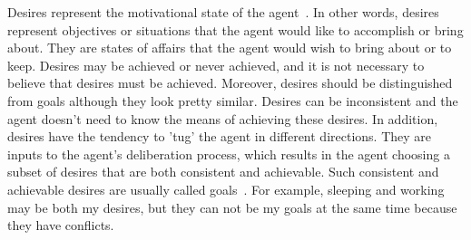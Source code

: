 Desires represent the motivational state of the agent~\cite{Rao_BDITheory_1995}.
In other words, desires represent objectives or situations that the agent would like to accomplish or bring about.
They are states of affairs that the agent would wish to bring about or to keep.
Desires may be achieved or never achieved, and it is not necessary to believe that desires must be achieved.
Moreover, desires should be distinguished from goals although they look pretty similar.
Desires can be inconsistent and the agent doesn't need to know the means of achieving these desires.
In addition, desires have the tendency to 'tug' the agent in different directions.
They are inputs to the agent's deliberation process, which results in the agent choosing a subset of desires that are both consistent and achievable.
Such consistent and achievable desires are usually called goals~\cite{Gerhard_MultiSystem_1999}.
For example, sleeping and working may be both my desires, but they can not be my goals at the same time because they have conflicts.

